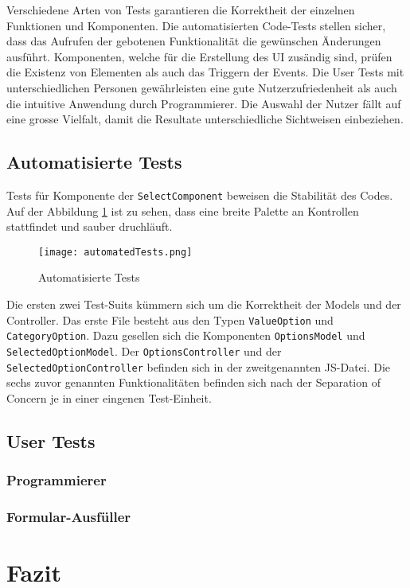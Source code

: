 Verschiedene Arten von Tests garantieren die Korrektheit der einzelnen Funktionen und Komponenten.
Die automatisierten Code-Tests stellen sicher, dass das Aufrufen der gebotenen Funktionalität die gewünschen Änderungen ausführt.
Komponenten, welche für die Erstellung des UI zusändig sind, prüfen die Existenz von Elementen als auch das Triggern der Events.
Die User Tests mit unterschiedlichen Personen gewährleisten eine gute Nutzerzufriedenheit als auch die intuitive Anwendung durch Programmierer.
Die Auswahl der Nutzer fällt auf eine grosse Vielfalt, damit die Resultate unterschiedliche Sichtweisen einbeziehen. 


\subsection{Automatisierte Tests}
\label{sec:automatedTests}

Tests für Komponente der \texttt{SelectComponent} beweisen die Stabilität des Codes.
Auf der Abbildung \ref{img:automatedTests} ist zu sehen, dass eine breite Palette an Kontrollen stattfindet und sauber druchläuft. 

\begin{figure}[!htb]
    \centering
    \texttt{[image: automatedTests.png]}
    \caption{Automatisierte Tests}
    \label{img:automatedTests}
\end{figure}

Die ersten zwei Test-Suits kümmern sich um die Korrektheit der Models und der Controller. 
Das erste File besteht aus den Typen \texttt{ValueOption} und \texttt{CategoryOption}. 
Dazu gesellen sich die Komponenten \texttt{OptionsModel} und \texttt{SelectedOptionModel}.
Der \texttt{OptionsController} und der \texttt{SelectedOptionController} befinden sich in der zweitgenannten JS-Datei.
Die sechs zuvor genannten Funktionalitäten befinden sich nach der Separation of Concern je in einer eingenen Test-Einheit.


\subsection{User Tests} %
\label{sec:userTests}


\subsubsection{Programmierer}
\label{sec:userTestsProgrammer}


\subsubsection{Formular-Ausfüller}
\label{sec:userTestsEnduser}



\section{Fazit}
\label{sec:summeryNew}

